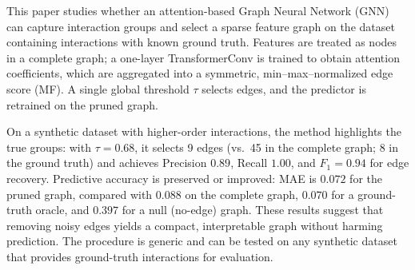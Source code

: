 This paper studies whether an attention-based Graph Neural Network (GNN) can capture interaction groups and select a sparse feature graph on the dataset containing interactions with known ground truth. Features are treated as nodes in a complete graph; a one-layer TransformerConv is trained to obtain attention coefficients, which are aggregated into a symmetric, min–max–normalized edge score (MF). A single global threshold $\tau$ selects edges, and the predictor is retrained on the pruned graph.

On a synthetic dataset with higher-order interactions, the method highlights the true groups: with $\tau{=}0.68$, it selects 9 edges (vs.\ 45 in the complete graph; 8 in the ground truth) and achieves Precision $0.89$, Recall $1.00$, and $F_1{=}0.94$ for edge recovery. Predictive accuracy is preserved or improved: MAE is $0.072$ for the pruned graph, compared with $0.088$ on the complete graph, $0.070$ for a ground-truth oracle, and $0.397$ for a null (no-edge) graph. These results suggest that removing noisy edges yields a compact, interpretable graph without harming prediction. The procedure is generic and can be tested on any synthetic dataset that provides ground-truth interactions for evaluation.